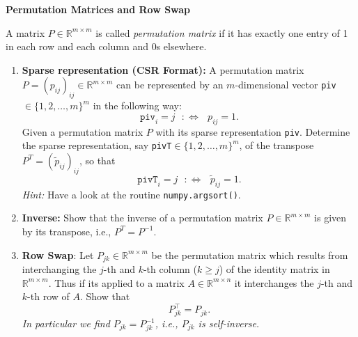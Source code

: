 \textbf{Permutation Matrices and Row Swap}

A matrix $P\in \mathbb{R}^{m \times m}$ is called \textit{permutation matrix} if it has exactly one entry of 1 in each row and each column and 0s elsewhere.
\begin{enumerate}
	\item \textbf{Sparse representation (CSR Format):} A permutation matrix $P=(p_{ij})_{ij}\in \mathbb{R}^{m \times m}$ can be represented by an $m$-dimensional vector \verb|piv|$\in \{1,2,\ldots,m\}^m$  in the following way:
	$$\texttt{piv}_i = j ~~~:\Leftrightarrow~~~ p_{ij} = 1. $$	
	Given a permutation matrix $P$ with its sparse representation \texttt{piv}. Determine the sparse representation, say \texttt{pivT}$\in \{1,2,\ldots,m\}^m$, of the transpose $P^T = (\widetilde{p}_{ij})_{ij}$, so that
	$$\texttt{pivT}_i = j ~~~:\Leftrightarrow~~~ \widetilde{p}_{ij} = 1. $$
	\textit{Hint:} Have a look at the routine \texttt{numpy.argsort()}.	
	\item \textbf{Inverse:} Show that the inverse of a permutation matrix $P\in \mathbb{R}^{m \times m}$ is given by its transpose, i.e., $P^T = P^{-1}$.
	\item \textbf{Row Swap}: Let $P_{jk} \in \mathbb{R}^{m \times m}$ be the permutation matrix which results from interchanging the $j$-th and $k$-th column ($k \geq j$) of the identity matrix in $\mathbb{R}^{m \times m}$. Thus if its applied to a matrix $A \in \mathbb{R}^{m \times n}$ it interchanges the $j$-th and $k$-th row  of $A$. Show that 
	$$P_{jk}^\top = P_{jk}. $$
	\textit{In particular we find $P_{jk} = P_{jk}^{-1}$, i.e., $P_{jk}$ is self-inverse.}
\end{enumerate}